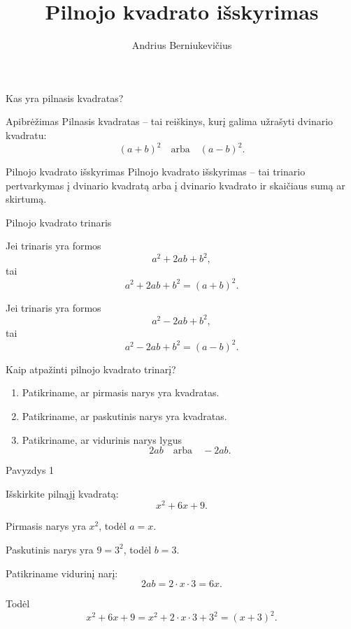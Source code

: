 \documentclass[aspectratio=169,11pt]{beamer}
\title{Pilnojo kvadrato išskyrimas}
\author{Andrius Berniukevičius}
\date{}
\begin{document}
\begin{frame}
    \titlepage
\end{frame}

\begin{frame}{Kas yra pilnasis kvadratas?}

\begin{block}{Apibrėžimas}
Pilnasis kvadratas -- tai reiškinys, kurį galima užrašyti dvinario kvadratu:
\[
(a+b)^2 \quad \text{arba} \quad (a-b)^2.
\]
\end{block}

\pause

\begin{block}{Pilnojo kvadrato išskyrimas}
Pilnojo kvadrato išskyrimas -- tai trinario pertvarkymas į dvinario
kvadratą arba į dvinario kvadrato ir skaičiaus sumą ar skirtumą.
\end{block}

\end{frame}

\begin{frame}{Pilnojo kvadrato trinaris}

Jei trinaris yra formos
\[
a^2+2ab+b^2,
\]
\pause
tai
\[
a^2+2ab+b^2=(a+b)^2.
\]

\pause

Jei trinaris yra formos
\[
a^2-2ab+b^2,
\]
\pause
tai
\[
a^2-2ab+b^2=(a-b)^2.
\]

\end{frame}

\begin{frame}{Kaip atpažinti pilnojo kvadrato trinarį?}

\begin{enumerate}[<+->]
    \item Patikriname, ar pirmasis narys yra kvadratas.
    \item Patikriname, ar paskutinis narys yra kvadratas.
    \item Patikriname, ar vidurinis narys lygus
    \[
    2ab \quad \text{arba} \quad -2ab.
    \]
\end{enumerate}

\end{frame}

\begin{frame}{Pavyzdys 1}

Išskirkite pilnąjį kvadratą:
\[
x^2+6x+9.
\]

\pause

Pirmasis narys yra $x^2$, todėl $a=x$.

\pause

Paskutinis narys yra $9=3^2$, todėl $b=3$.

\pause

Patikriname vidurinį narį:
\[
2ab=2\cdot x\cdot3=6x.
\]

\pause

Todėl
\[
x^2+6x+9=x^2+2\cdot x\cdot3+3^2=(x+3)^2.
\]

\end{frame}
\end{document}
